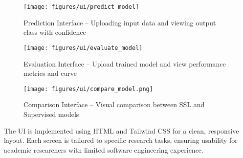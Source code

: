 \begin{figure}[H]
    \centering
    \texttt{[image: figures/ui/predict\_model]}
    \caption{Prediction Interface – Uploading input data and viewing output class with confidence}
\end{figure}

\begin{figure}[H]
    \centering
    \texttt{[image: figures/ui/evaluate\_model]}
    \caption{Evaluation Interface – Upload trained model and view performance metrics and curve}
\end{figure}

\begin{figure}[H]
    \centering
    \texttt{[image: figures/ui/compare\_model.png]}
    \caption{Comparison Interface – Visual comparison between SSL and Supervised models}
\end{figure}

The UI is implemented using HTML and Tailwind CSS for a clean, responsive layout. Each screen is tailored to specific research tasks, ensuring usability for academic researchers with limited software engineering experience.
